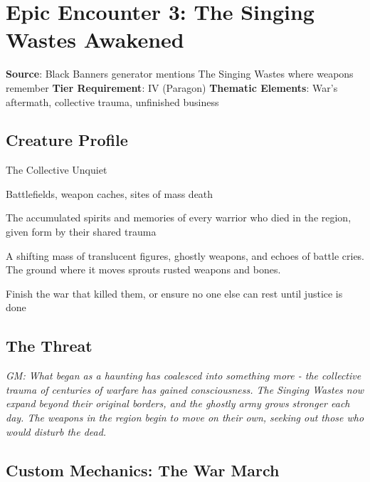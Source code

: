 \documentclass[11pt]{article}
\newcommand{\gm}[1]{\textit{GM: #1}}
\begin{document}
\section*{Epic Encounter 3: The Singing Wastes Awakened}

\begin{mdframed}[backgroundcolor=epicbg]
\textbf{Source}: Black Banners generator mentions The Singing Wastes where weapons remember
\textbf{Tier Requirement}: IV (Paragon)
\textbf{Thematic Elements}: War's aftermath, collective trauma, unfinished business
\end{mdframed}

\subsection*{Creature Profile}

\begin{description}[leftmargin=*]
\item[Name] The Collective Unquiet
\item[Domain] Battlefields, weapon caches, sites of mass death
\item[Nature] The accumulated spirits and memories of every warrior who died in the region, given form by their shared trauma
\item[Appearance] A shifting mass of translucent figures, ghostly weapons, and echoes of battle cries. The ground where it moves sprouts rusted weapons and bones.
\item[Motivation] Finish the war that killed them, or ensure no one else can rest until justice is done
\end{description}

\subsection*{The Threat}

\gm{What began as a haunting has coalesced into something more - the collective trauma of centuries of warfare has gained consciousness. The Singing Wastes now expand beyond their original borders, and the ghostly army grows stronger each day. The weapons in the region begin to move on their own, seeking out those who would disturb the dead.}

\subsection*{Custom Mechanics: The War March}
\end{document}

